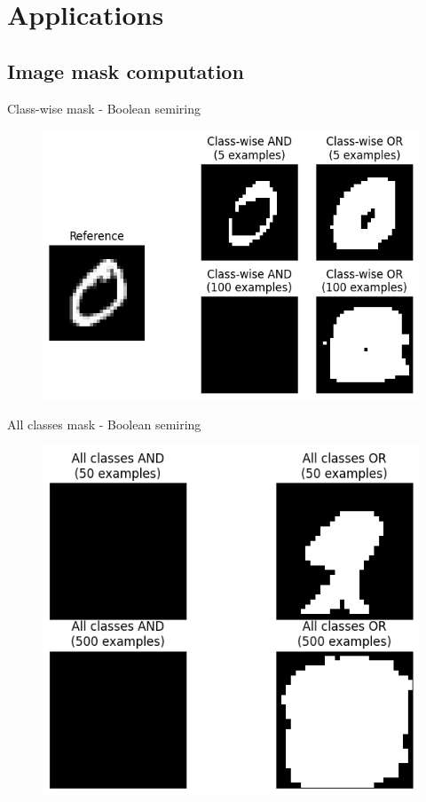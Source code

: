 \documentclass[aspectratio=169]{beamer}
\theoremstyle{definition}
\begin{document}

\section{Applications}
\subsection{Image mask computation}
\begin{frame}{Class-wise mask - Boolean semiring}
    \begin{figure}
        \includegraphics[width=.65\textwidth]{boolean-mask.png}
    \end{figure}
\end{frame}

\begin{frame}{All classes mask - Boolean semiring}
    \begin{figure}
        \includegraphics[width=.5\textwidth]{boolean-mask-all.png}
    \end{figure}
\end{frame}
\end{document}
